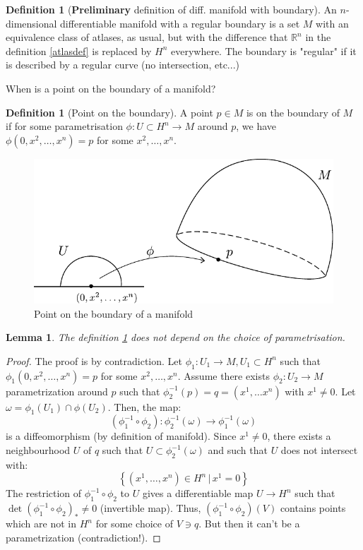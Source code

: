 \documentclass[a4paper,11pt,titlepage, article, oneside]{memoir}
\numberwithin{equation}{section}
\newtheorem{lemma}[theorem]{Lemma}
\theoremstyle{definition}
\newtheorem{definition}[theorem]{Definition}
\theoremstyle{remark}
\newcommand{\rfield}{\mathbb{R}}
\begin{document}
\begin{definition}[\textbf{Preliminary} definition of diff. manifold with boundary]
  An $n$-dimensional differentiable manifold with a regular boundary is a set $M$ with an equivalence class of atlases, as usual, but with the difference that $\rfield^n$ in the definition \ref{atlasdef} is replaced by $H^n$ everywhere. The boundary is "regular" if it is described by a regular curve (no intersection, etc...)
\end{definition}

When is a point on the boundary of a manifold?
\begin{definition} [Point on the boundary] \label{pointbdr}
  A point $p \in M$ is on the boundary of $M$ if for some parametrisation $\phi \colon U \subset H^n \rightarrow M$ around $p$, we have $\phi(0, x^2, \ldots, x^n) = p$ for some $x^2, \ldots, x^n$.
  \begin{figure}[H]
     \centering
     \includegraphics[width=.6\linewidth]{images/boundary.pdf}
     \caption{Point on the boundary of a manifold} \label{Fig:boundarypic}
\end{figure}
\end{definition}

\begin{lemma}
  The definition \ref{pointbdr} does not depend on the choice of parametrisation.
\end{lemma}
\begin{proof}
The proof is by contradiction.
Let $\phi_1 \colon U_1 \rightarrow M, U_1 \subset H^n$ such that $\phi_1(0, x^2, \ldots, x^n)=p$ for some $x^2, \ldots, x^n$. Assume there exists $\phi_2 \colon U_2 \rightarrow M$ parametrization around $p$ such that $\phi_2^{-1}(p) = q = (x^1, \ldots x^n)$ with $x^1 \not = 0$. Let $\omega = \phi_1(U_1) \cap \phi(U_2)$. Then, the map:
\[\left ( \phi_1^{-1} \circ \phi_2 \right) \colon \phi_2^{-1}(\omega) \rightarrow \phi_1^{-1}(\omega)\]
is a diffeomorphism (by definition of manifold). Since $x^1 \not = 0$, there exists a neighbourhood $U$ of $q$ such that $U \subset \phi_2^{-1}(\omega)$ and such that $U$ does not intersect with:
\[\left \{ (x^1, \ldots , x^n ) \in H^n \, | \, x^1= 0 \right \}\]
The restriction of $\phi_1^{-1} \circ \phi_2$ to $U$ gives a differentiable map $U \rightarrow H^n$ such that $\det(\phi_1^{-1} \circ \phi_2)_* \not = 0$ (invertible map). Thus, $(\phi_1^{-1} \circ \phi_2)(V)$ contains points which are not in $H^n$ for some choice of $V \ni q$. But then it can't be a parametrization (contradiction!).
\end{proof}
\end{document}
